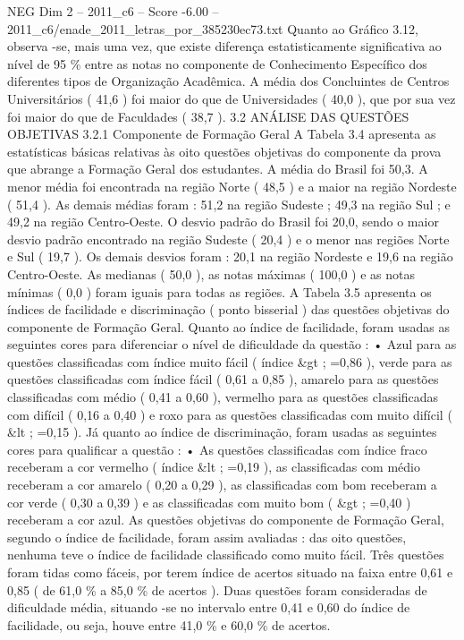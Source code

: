 \begin{textsample}{NEG Dim 2 – 2011\_c6 – Score -6.00 – 2011\_c6/enade\_2011\_letras\_por\_385230ec73.txt}
Quanto ao Gráfico 3.12, observa -se, mais uma vez, que existe diferença estatisticamente significativa ao nível de 95 \% entre as notas no componente de Conhecimento Específico dos diferentes tipos de Organização Acadêmica.
A média dos Concluintes de Centros Universitários ( 41,6 ) foi maior do que de Universidades ( 40,0 ), que por sua vez foi maior do que de Faculdades ( 38,7 ). 3.2 ANÁLISE DAS QUESTÕES OBJETIVAS 3.2.1 Componente de Formação Geral A Tabela 3.4 apresenta as estatísticas básicas relativas às oito questões objetivas do componente da prova que abrange a Formação Geral dos estudantes.
A média do Brasil foi 50,3.
A menor média foi encontrada na região Norte ( 48,5 ) e a maior na região Nordeste ( 51,4 ).
As demais médias foram : 51,2 na região Sudeste ; 49,3 na região Sul ; e 49,2 na região Centro-Oeste.
O desvio padrão do Brasil foi 20,0, sendo o maior desvio padrão encontrado na região Sudeste ( 20,4 ) e o menor nas regiões Norte e Sul ( 19,7 ).
Os demais desvios foram : 20,1 na região Nordeste e 19,6 na região Centro-Oeste.
As medianas ( 50,0 ), as notas máximas ( 100,0 ) e as notas mínimas ( 0,0 ) foram iguais para todas as regiões.
A Tabela 3.5 apresenta os índices de facilidade e discriminação ( ponto bisserial ) das questões objetivas do componente de Formação Geral.
Quanto ao índice de facilidade, foram usadas as seguintes cores para diferenciar o nível de dificuldade da questão : • Azul para as questões classificadas com índice muito fácil ( índice \&gt ; =0,86 ), verde para as questões classificadas com índice fácil ( 0,61 a 0,85 ), amarelo para as questões classificadas com médio ( 0,41 a 0,60 ), vermelho para as questões classificadas com difícil ( 0,16 a 0,40 ) e roxo para as questões classificadas com muito difícil ( \&lt ; =0,15 ).
Já quanto ao índice de discriminação, foram usadas as seguintes cores para qualificar a questão : • As questões classificadas com índice fraco receberam a cor vermelho ( índice \&lt ; =0,19 ), as classificadas com médio receberam a cor amarelo ( 0,20 a 0,29 ), as classificadas com bom receberam a cor verde ( 0,30 a 0,39 ) e as classificadas com muito bom ( \&gt ; =0,40 ) receberam a cor azul.
As questões objetivas do componente de Formação Geral, segundo o índice de facilidade, foram assim avaliadas : das oito questões, nenhuma teve o índice de facilidade classificado como muito fácil.
Três questões foram tidas como fáceis, por terem índice de acertos situado na faixa entre 0,61 e 0,85 ( de 61,0 \% a 85,0 \% de acertos ).
Duas questões foram consideradas de dificuldade média, situando -se no intervalo entre 0,41 e 0,60 do índice de facilidade, ou seja, houve entre 41,0 \% e 60,0 \% de acertos.

\end{textsample}

